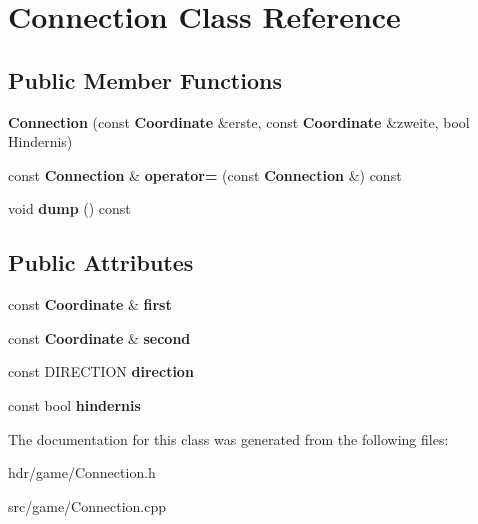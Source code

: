 \section{Connection Class Reference}
\label{class_connection}
\subsection*{Public Member Functions}
\begin{DoxyCompactItemize}
\item 
{\bfseries Connection} (const {\bf Coordinate} \&erste, const {\bf Coordinate} \&zweite, bool Hindernis)\label{class_connection_acff2b5b881817a7b6e8d8173a1937640}

\item 
const {\bf Connection} \& {\bfseries operator=} (const {\bf Connection} \&) const \label{class_connection_a715ee5805776e50b971d5772267e4b46}

\item 
void {\bfseries dump} () const \label{class_connection_a67b9ea26a5f1419c2715e87f26dbb2f4}

\end{DoxyCompactItemize}
\subsection*{Public Attributes}
\begin{DoxyCompactItemize}
\item 
const {\bf Coordinate} \& {\bfseries first}\label{class_connection_a1e4300e2849a2daebf4b1e4577ef1ea8}

\item 
const {\bf Coordinate} \& {\bfseries second}\label{class_connection_a968eaf3cec0996491425d8569e42416f}

\item 
const D\-I\-R\-E\-C\-T\-I\-O\-N {\bfseries direction}\label{class_connection_aa417c011125675e3faf7f5ec1fe4192b}

\item 
const bool {\bfseries hindernis}\label{class_connection_ae29f9a099c5d00919eb45123864fb7f4}

\end{DoxyCompactItemize}


The documentation for this class was generated from the following files\-:\begin{DoxyCompactItemize}
\item 
hdr/game/Connection.\-h\item 
src/game/Connection.\-cpp\end{DoxyCompactItemize}

